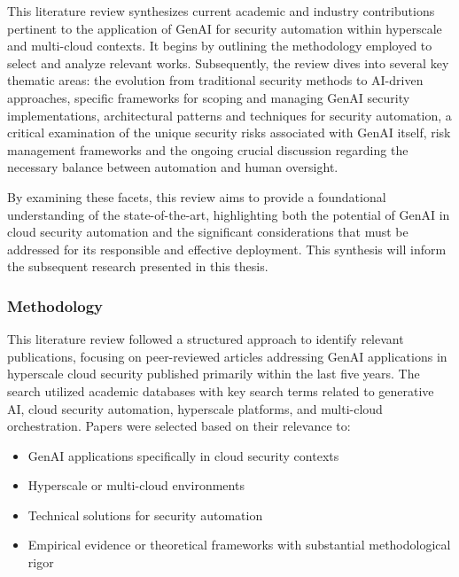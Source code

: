 This literature review synthesizes current academic and industry contributions pertinent to the application of GenAI for security automation within hyperscale and multi-cloud contexts. It begins by outlining the methodology employed to select and analyze relevant works. Subsequently, the review dives into several key thematic areas: the evolution from traditional security methods to AI-driven approaches, specific frameworks for scoping and managing GenAI security implementations, architectural patterns and techniques for security automation, a critical examination of the unique security risks associated with GenAI itself, risk management frameworks and the ongoing crucial discussion regarding the necessary balance between automation and human oversight.

By examining these facets, this review aims to provide a foundational understanding of the state-of-the-art, highlighting both the potential of GenAI in cloud security automation and the significant considerations that must be addressed for its responsible and effective deployment. This synthesis will inform the subsequent research presented in this thesis.

\subsubsection{Methodology} %
\label{sec:Methodology}

This literature review followed a structured approach to identify relevant publications, focusing on peer-reviewed articles addressing GenAI applications in hyperscale cloud security published primarily within the last five years. The search utilized academic databases with key search terms related to generative AI, cloud security automation, hyperscale platforms, and multi-cloud orchestration.
Papers were selected based on their relevance to:

\begin{itemize}
\item GenAI applications specifically in cloud security contexts
\item Hyperscale or multi-cloud environments
\item Technical solutions for security automation
\item Empirical evidence or theoretical frameworks with substantial methodological rigor
\end{itemize}

